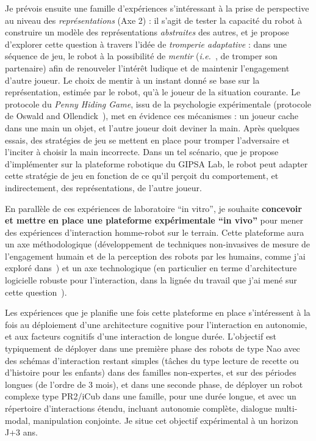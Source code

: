 \documentclass[a4paper]{article}
\newcommand{\ie}{{\textit{i.e.~}}}
\begin{document}
Je prévois ensuite une famille d'expériences s'intéressant à la prise de
perspective au niveau des \emph{représentations} (Axe 2) : il s'agit de tester
la capacité du robot à construire un modèle des représentations
\emph{abstraites} des autres, et je propose d'explorer cette question à travers
l'idée de \emph{tromperie adaptative} : dans une séquence de jeu, le robot à la
possibilité de \emph{mentir} (\ie, de tromper son partenaire) afin de renouveler
l'intérêt ludique et de maintenir l'engagement d'autre joueur. Le choix de
mentir à un instant donné se base sur la représentation, estimée par le robot,
qu'à le joueur de la situation courante. Le protocole du \emph{Penny Hiding
Game}, issu de la psychologie expérimentale (protocole de Oswald and
Ollendick~\cite{oswald1989role}), met en évidence ces mécanismes : un joueur
cache dans une main un objet, et l'autre joueur doit deviner la main.  Après
quelques essais, des stratégies de jeu se mettent en place pour tromper
l'adversaire et l'inciter à choisir la main incorrecte. Dans un tel scénario,
que je propose d'implémenter sur la plateforme robotique du GIPSA Lab, le robot
peut adapter cette stratégie de jeu en fonction de ce qu'il perçoit du
comportement, et indirectement, des représentations, de l'autre joueur.

En parallèle de ces expériences de laboratoire ``in vitro'', je souhaite
\textbf{concevoir et mettre en place une plateforme expérimentale ``in vivo''}
pour mener des expériences d'interaction homme-robot sur le terrain. Cette
plateforme aura un axe méthodologique (développement de techniques non-invasives
de mesure de l'engagement humain et de la perception des robots par les humains,
comme j'ai exploré
dans~\cite{lemaignan2014dynamics,lemaignan2014cognitive,fink2014dynamics,sharma2015measuring})
et un axe technologique (en particulier en terme d'architecture logicielle
robuste pour l'interaction, dans la lignée du travail que j'ai mené sur cette
question~\cite{lemaignan2014human,lemaignan2015pyrobots}).

Les expériences que je planifie une fois cette plateforme en place s'intéressent
à la fois au déploiement d'une architecture cognitive pour l'interaction en
autonomie, et aux facteurs cognitifs d'une interaction de longue durée.
L'objectif est typiquement de déployer dans une première phase des robots de
type Nao avec des schémas d'interaction restant simples (tâches du type lecture
de recette ou d'histoire pour les enfants) dans des familles non-expertes, et
sur des périodes longues (de l'ordre de 3 mois), et dans une seconde phase, de
déployer un robot complexe type PR2/iCub dans une famille, pour une durée
longue, et avec un répertoire d'interactions étendu, incluant autonomie
complète, dialogue multi-modal, manipulation conjointe. Je situe cet objectif
expérimental à un horizon J+3 ans.
\end{document}
